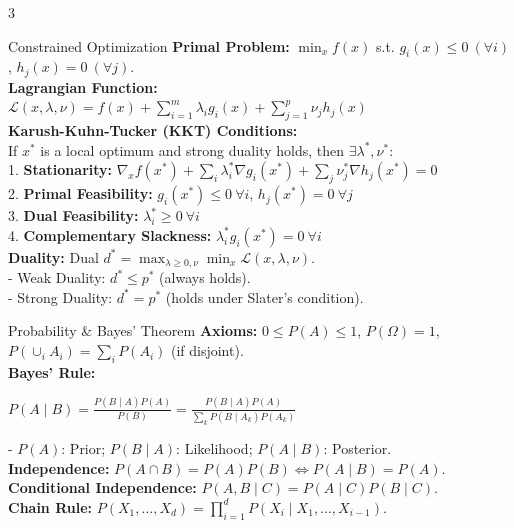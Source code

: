 \documentclass[10pt]{article}
\begin{document}
\begin{multicols*}{3}
\begin{calcBox}{Constrained Optimization}
\textbf{Primal Problem:} $\min_x f(x)$ s.t. $g_i(x) \le 0 \ (\forall i)$, $h_j(x) = 0 \ (\forall j)$. \\
\textbf{Lagrangian Function:} \\
$\mathcal{L}(x, \lambda, \nu) = f(x) + \sum_{i=1}^m \lambda_i g_i(x) + \sum_{j=1}^p \nu_j h_j(x)$ \\
\textbf{Karush-Kuhn-Tucker (KKT) Conditions:} \\
If $x^*$ is a local optimum and strong duality holds, then $\exists \lambda^*, \nu^*$: \\
1. \textbf{Stationarity:} $\nabla_x f(x^*) + \sum_i \lambda^*_i \nabla g_i(x^*) + \sum_j \nu^*_j \nabla h_j(x^*) = 0$ \\
2. \textbf{Primal Feasibility:} $g_i(x^*) \le 0 \ \forall i$, $h_j(x^*) = 0 \ \forall j$ \\
3. \textbf{Dual Feasibility:} $\lambda^*_i \ge 0 \ \forall i$ \\
4. \textbf{Complementary Slackness:} $\lambda^*_i g_i(x^*) = 0 \ \forall i$ \\
\textbf{Duality:} Dual $d^* = \max_{\lambda \ge 0, \nu} \min_x \mathcal{L}(x, \lambda, \nu)$. \\
- Weak Duality: $d^* \le p^*$ (always holds). \\
- Strong Duality: $d^* = p^*$ (holds under Slater's condition).
\end{calcBox}

\begin{calcBox}{Probability \& Bayes' Theorem}
\textbf{Axioms:} $0 \le P(A) \le 1$, $P(\Omega) = 1$, $P(\cup_i A_i) = \sum_i P(A_i)$ (if disjoint). \\
\textbf{Bayes' Rule:} \\
{\centering $P(A \mid B) = \frac{P(B \mid A)P(A)}{P(B)} = \frac{P(B \mid A)P(A)}{\sum_k P(B \mid A_k)P(A_k)}$\par}
- $P(A)$: Prior; $P(B \mid A)$: Likelihood; $P(A \mid B)$: Posterior. \\
\textbf{Independence:} $P(A \cap B) = P(A)P(B) \iff P(A \mid B) = P(A)$. \\
\textbf{Conditional Independence:} $P(A, B \mid C) = P(A \mid C)P(B \mid C)$. \\
\textbf{Chain Rule:} $P(X_1, \dots, X_d) = \prod_{i=1}^d P(X_i \mid X_1, \dots, X_{i-1})$.
\end{calcBox}

\columnbreak


\end{multicols*}
\end{document}
